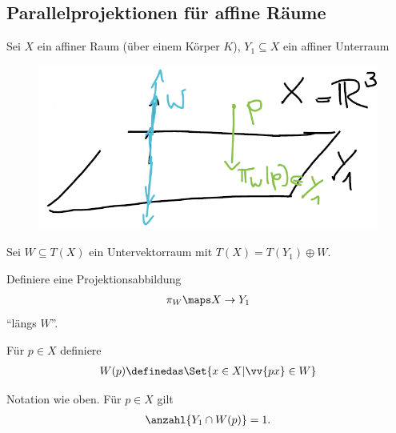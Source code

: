 \subsection*{Parallelprojektionen für affine Räume}
Sei \( X \) ein affiner Raum (über einem Körper \( K \)), \( Y_1\subseteq X \) ein affiner Unterraum
\begin{beispiel*}
    \begin{figure}[H]
        \centering
        \includegraphics[width=0.5\linewidth]{figures/affine_parallelprojektion_r_3}
        \label{fig:affine_parallelprojektion_r_3}
    \end{figure}
    
\end{beispiel*}
Sei \( W\subseteq T(X) \) ein Untervektorraum mit \( T(X)=T(Y_1)\oplus W \).
\begin{ziel*}
    Definiere eine Projektionsabbildung
    \begin{align*}
        \pi_W\maps X\to Y_1
    \end{align*}
    \enquote{längs \( W \)}.
\end{ziel*}
Für \( p\in X \) definiere
\begin{align*}
    W(p)\definedas\Set{x\in X| \vv{px}\in W}
\end{align*}
\begin{lemma}
    Notation wie oben.
    Für \( p\in X \) gilt
    \begin{align*}
        \anzahl{Y_1\cap W(p)}=1.
    \end{align*}
\end{lemma}
